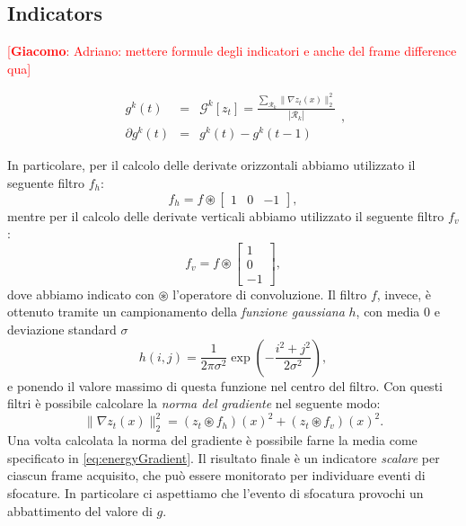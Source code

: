 \documentclass{llncs}
\newcommand{\gi}[1]{{\textcolor{red}{[\small \textbf{Giacomo}: #1]}}}
\begin{document}
\subsection{Indicators}\label{subsec:Indicators}
\gi{Adriano: mettere formule degli indicatori e anche del frame difference qua}

\begin{equation}
\label{eq:gradientRegions}
\begin{array}{ccc}
g^k(t)&  = & \mathcal{G}^k[z_t] = \frac{\sum_{\mathcal{R}_k}\| \nabla z_t(x) \| _2^2 }{|{\mathcal{R}_k}|}\\
\partial g^k(t) & =& g^k(t)-g^k(t-1) 
\end{array},
\end{equation}

In particolare, per il calcolo delle derivate orizzontali  abbiamo utilizzato il seguente filtro $f_h$:
\[f_h = f \circledast \left[ \begin{array}{rcl}
1 & 0 & -1
\end{array}\right], \] 
mentre per il calcolo delle derivate verticali abbiamo utilizzato il seguente filtro $f_v$:
\[f_v = f \circledast \left[ \begin{array}{r}
1 \\ 0 \\ -1
\end{array}\right], \]
dove abbiamo indicato con $\circledast$ l'operatore di convoluzione.
Il filtro $f$, invece, \`e ottenuto tramite un campionamento della \textit{funzione gaussiana} $h$, con media $0$ e deviazione standard $\sigma$
\begin{equation}
\label{eq:gaussian}
h(i,j)=\frac{1}{2\pi\sigma^2}\exp\left(-\frac{i^2+j^2}{2\sigma^2}\right),
\end{equation}
e ponendo il valore massimo di questa funzione nel centro del filtro.
Con questi filtri \`e possibile calcolare la \textit{norma del gradiente} nel seguente modo:
\begin{equation}
\label{eq:normaGradiente}
\| \nabla z_t(x) \|_2^2=\left(z_t \circledast f_h\right)(x)^2 + \left(z_t \circledast f_v\right)(x)^2.
\end{equation}
Una volta calcolata la norma del gradiente \`e possibile farne la media come specificato in \eqref{eq:energyGradient}.
Il risultato finale \`e un indicatore \textit{scalare} per ciascun frame acquisito, che pu\`o essere monitorato per individuare eventi di sfocature. 
In particolare ci aspettiamo che l'evento di sfocatura provochi un abbattimento del valore di $g$.
\end{document}
